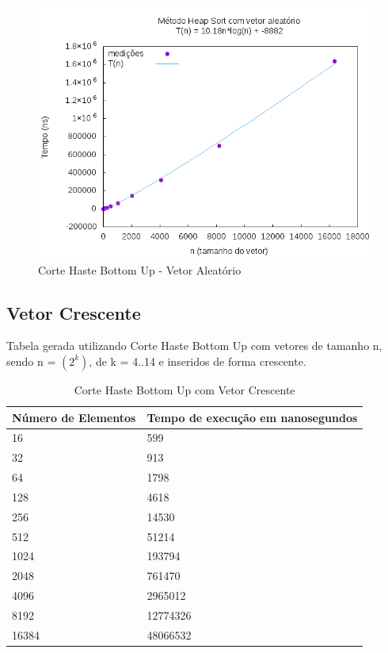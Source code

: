 \documentclass[12pt,a4paper,twoside]{report}
\begin{document}
\begin{figure}[H]
    \centering
    \includegraphics[width=0.7\linewidth]{graficos/HeapSort/vIntAleatorio/vIntAleatorio.png}
  \caption{Corte Haste Bottom Up - Vetor Aleatório}
\end{figure}

\subsection{Vetor Crescente}
Tabela gerada utilizando Corte Haste Bottom Up com vetores de tamanho n, sendo n = $(2^k)$, de k = 4..14 e inseridos de forma crescente.
\begin{table}[H]
\centering
\caption{Corte Haste Bottom Up com Vetor Crescente}
\label{my-label}
\begin{tabular}{|l|l|}
\hline
\multicolumn{1}{|c|}{\textbf{Número de Elementos}} & \multicolumn{1}{c|}{\textbf{Tempo de execução em nanosegundos}} \\ \hline
16 & 599 \\ \hline
32 & 913 \\ \hline
64 & 1798 \\ \hline
128 & 4618 \\ \hline
256 & 14530 \\ \hline
512 & 51214 \\ \hline
1024 & 193794 \\ \hline
2048 & 761470 \\ \hline
4096 & 2965012 \\ \hline
8192 & 12774326 \\ \hline
16384 & 48066532 \\ \hline
\end{tabular}
\end{table}
\end{document}
